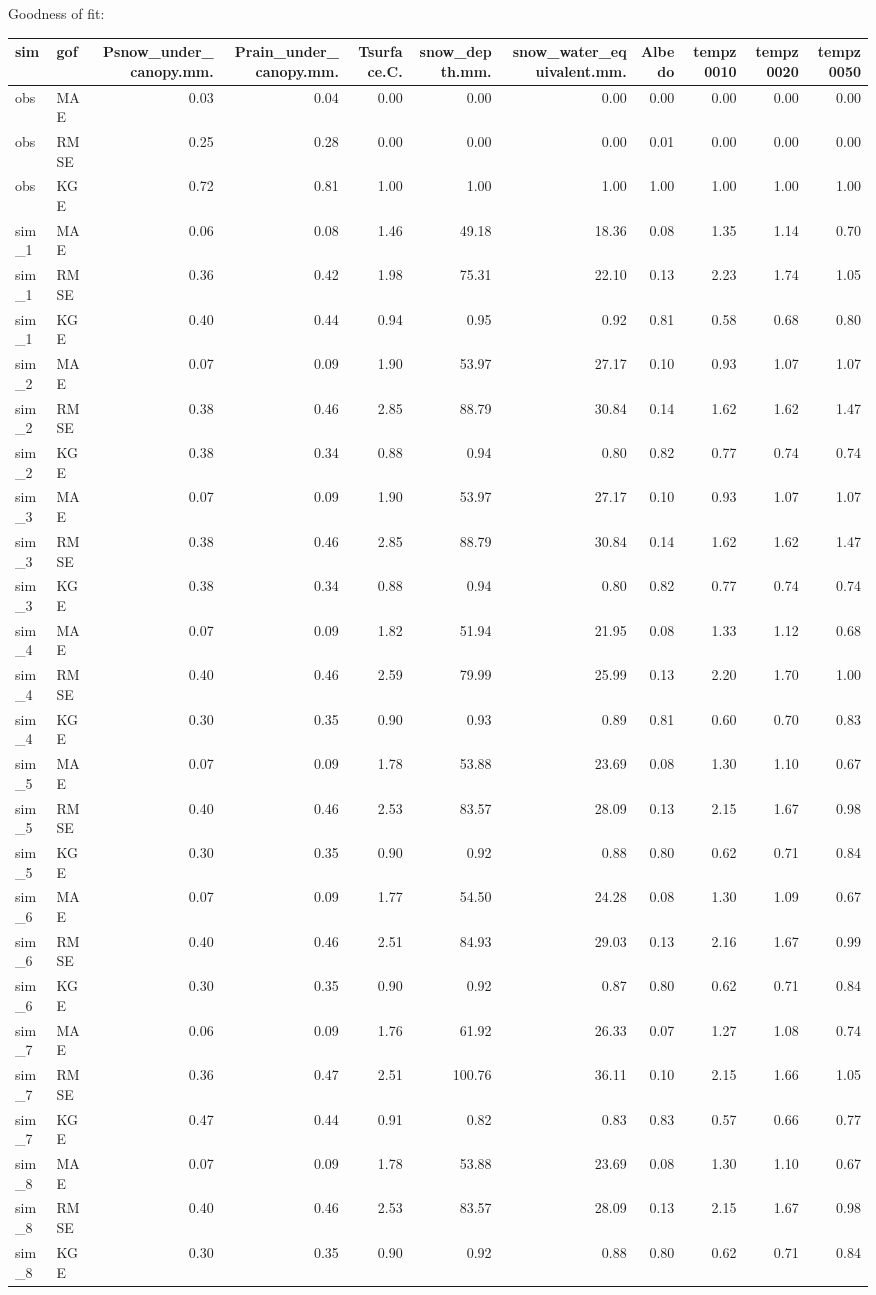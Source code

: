 \documentclass[
]{article}
\begin{document}
Goodness of fit:

\begin{longtable}[]{@{}llrrrrrrrrr@{}}
\toprule
sim & gof & Psnow\_under\_canopy.mm. & Prain\_under\_canopy.mm. &
Tsurface.C. & snow\_depth.mm. & snow\_water\_equivalent.mm. & Albedo &
tempz0010 & tempz0020 & tempz0050\tabularnewline
\midrule
\endhead
obs & MAE & 0.03 & 0.04 & 0.00 & 0.00 & 0.00 & 0.00 & 0.00 & 0.00 &
0.00\tabularnewline
obs & RMSE & 0.25 & 0.28 & 0.00 & 0.00 & 0.00 & 0.01 & 0.00 & 0.00 &
0.00\tabularnewline
obs & KGE & 0.72 & 0.81 & 1.00 & 1.00 & 1.00 & 1.00 & 1.00 & 1.00 &
1.00\tabularnewline
sim\_1 & MAE & 0.06 & 0.08 & 1.46 & 49.18 & 18.36 & 0.08 & 1.35 & 1.14 &
0.70\tabularnewline
sim\_1 & RMSE & 0.36 & 0.42 & 1.98 & 75.31 & 22.10 & 0.13 & 2.23 & 1.74
& 1.05\tabularnewline
sim\_1 & KGE & 0.40 & 0.44 & 0.94 & 0.95 & 0.92 & 0.81 & 0.58 & 0.68 &
0.80\tabularnewline
sim\_2 & MAE & 0.07 & 0.09 & 1.90 & 53.97 & 27.17 & 0.10 & 0.93 & 1.07 &
1.07\tabularnewline
sim\_2 & RMSE & 0.38 & 0.46 & 2.85 & 88.79 & 30.84 & 0.14 & 1.62 & 1.62
& 1.47\tabularnewline
sim\_2 & KGE & 0.38 & 0.34 & 0.88 & 0.94 & 0.80 & 0.82 & 0.77 & 0.74 &
0.74\tabularnewline
sim\_3 & MAE & 0.07 & 0.09 & 1.90 & 53.97 & 27.17 & 0.10 & 0.93 & 1.07 &
1.07\tabularnewline
sim\_3 & RMSE & 0.38 & 0.46 & 2.85 & 88.79 & 30.84 & 0.14 & 1.62 & 1.62
& 1.47\tabularnewline
sim\_3 & KGE & 0.38 & 0.34 & 0.88 & 0.94 & 0.80 & 0.82 & 0.77 & 0.74 &
0.74\tabularnewline
sim\_4 & MAE & 0.07 & 0.09 & 1.82 & 51.94 & 21.95 & 0.08 & 1.33 & 1.12 &
0.68\tabularnewline
sim\_4 & RMSE & 0.40 & 0.46 & 2.59 & 79.99 & 25.99 & 0.13 & 2.20 & 1.70
& 1.00\tabularnewline
sim\_4 & KGE & 0.30 & 0.35 & 0.90 & 0.93 & 0.89 & 0.81 & 0.60 & 0.70 &
0.83\tabularnewline
sim\_5 & MAE & 0.07 & 0.09 & 1.78 & 53.88 & 23.69 & 0.08 & 1.30 & 1.10 &
0.67\tabularnewline
sim\_5 & RMSE & 0.40 & 0.46 & 2.53 & 83.57 & 28.09 & 0.13 & 2.15 & 1.67
& 0.98\tabularnewline
sim\_5 & KGE & 0.30 & 0.35 & 0.90 & 0.92 & 0.88 & 0.80 & 0.62 & 0.71 &
0.84\tabularnewline
sim\_6 & MAE & 0.07 & 0.09 & 1.77 & 54.50 & 24.28 & 0.08 & 1.30 & 1.09 &
0.67\tabularnewline
sim\_6 & RMSE & 0.40 & 0.46 & 2.51 & 84.93 & 29.03 & 0.13 & 2.16 & 1.67
& 0.99\tabularnewline
sim\_6 & KGE & 0.30 & 0.35 & 0.90 & 0.92 & 0.87 & 0.80 & 0.62 & 0.71 &
0.84\tabularnewline
sim\_7 & MAE & 0.06 & 0.09 & 1.76 & 61.92 & 26.33 & 0.07 & 1.27 & 1.08 &
0.74\tabularnewline
sim\_7 & RMSE & 0.36 & 0.47 & 2.51 & 100.76 & 36.11 & 0.10 & 2.15 & 1.66
& 1.05\tabularnewline
sim\_7 & KGE & 0.47 & 0.44 & 0.91 & 0.82 & 0.83 & 0.83 & 0.57 & 0.66 &
0.77\tabularnewline
sim\_8 & MAE & 0.07 & 0.09 & 1.78 & 53.88 & 23.69 & 0.08 & 1.30 & 1.10 &
0.67\tabularnewline
sim\_8 & RMSE & 0.40 & 0.46 & 2.53 & 83.57 & 28.09 & 0.13 & 2.15 & 1.67
& 0.98\tabularnewline
sim\_8 & KGE & 0.30 & 0.35 & 0.90 & 0.92 & 0.88 & 0.80 & 0.62 & 0.71 &
0.84\tabularnewline
\bottomrule
\end{longtable}
\end{document}
